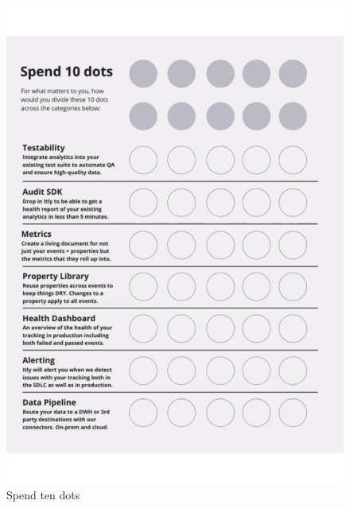 \begin{figure}
\begin{minipage}{.47\linewidth}
  \centering
  \includegraphics[width=\linewidth]{images/iteratively/spend-10-dots.pdf}
  {\footnotesize Spend ten dots}
  \label{fig:iteratively-spend-ten-dots}
\end{minipage}\hfill%
\begin{minipage}{.47\linewidth}
  \centering

\end{minipage}
\end{figure}
